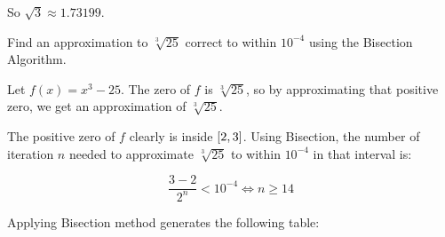 \documentclass[../../../../Assignments.tex]{subfiles}
\begin{document}
\begin{solution}
    So \(\sqrt{3} \approx \num{1.73199}\).
\end{solution}

\begin{exercise}
    Find an approximation to \(\sqrt[3]{25}\) correct to within \(10^{−4}\)
    using the Bisection Algorithm.
\end{exercise}

\begin{solution}
    Let \(f(x) = x^3 - 25\). The zero of \(f\) is \(\sqrt[3]{25}\), so by
    approximating that positive zero, we get an approximation of
    \(\sqrt[3]{25}\).

    The positive zero of \(f\) clearly is inside \(\interval{2}{3}\). Using
    Bisection, the number of iteration \(n\) needed to approximate
    \(\sqrt[3]{25}\) to within \(10^{-4}\) in that interval is:

    \[\frac{3 - 2}{2^n} < 10^{-4} \iff n \geq 14\]

    Applying Bisection method generates the following table:


\end{solution}
\end{document}
